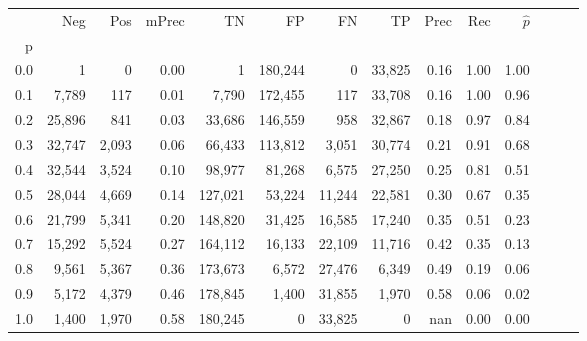 \begin{tabular}{rrrrrrrrrrrrrr}
\toprule
{} &     Neg &    Pos & mPrec &       TN &       FP &      FN &      TP &  Prec &   Rec & $\hat{p}$ \\
p   &         &        &       &          &          &         &         &       &       &           \\
\midrule
0.0 &       1 &      0 &  0.00 &        1 &  180,244 &       0 &  33,825 &  0.16 &  1.00 &      1.00 \\
0.1 &   7,789 &    117 &  0.01 &    7,790 &  172,455 &     117 &  33,708 &  0.16 &  1.00 &      0.96 \\
0.2 &  25,896 &    841 &  0.03 &   33,686 &  146,559 &     958 &  32,867 &  0.18 &  0.97 &      0.84 \\
0.3 &  32,747 &  2,093 &  0.06 &   66,433 &  113,812 &   3,051 &  30,774 &  0.21 &  0.91 &      0.68 \\
0.4 &  32,544 &  3,524 &  0.10 &   98,977 &   81,268 &   6,575 &  27,250 &  0.25 &  0.81 &      0.51 \\
0.5 &  28,044 &  4,669 &  0.14 &  127,021 &   53,224 &  11,244 &  22,581 &  0.30 &  0.67 &      0.35 \\
0.6 &  21,799 &  5,341 &  0.20 &  148,820 &   31,425 &  16,585 &  17,240 &  0.35 &  0.51 &      0.23 \\
0.7 &  15,292 &  5,524 &  0.27 &  164,112 &   16,133 &  22,109 &  11,716 &  0.42 &  0.35 &      0.13 \\
0.8 &   9,561 &  5,367 &  0.36 &  173,673 &    6,572 &  27,476 &   6,349 &  0.49 &  0.19 &      0.06 \\
0.9 &   5,172 &  4,379 &  0.46 &  178,845 &    1,400 &  31,855 &   1,970 &  0.58 &  0.06 &      0.02 \\
1.0 &   1,400 &  1,970 &  0.58 &  180,245 &        0 &  33,825 &       0 &   nan &  0.00 &      0.00 \\
\bottomrule
\end{tabular}
